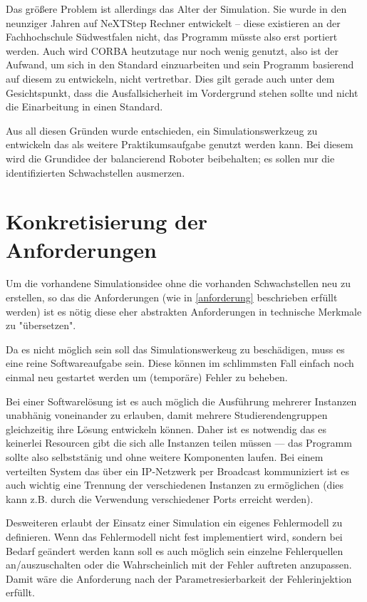 Das gr{\"{o}}{\ss}ere Problem ist allerdings das Alter der Simulation. Sie wurde in den neunziger Jahren auf 
NeXTStep Rechner entwickelt -- diese existieren an der Fachhochschule S{\"{u}}dwestfalen nicht, das Programm 
m{\"{u}}sste also erst portiert werden. Auch wird CORBA heutzutage nur noch wenig genutzt, also ist der Aufwand,
um sich in den Standard einzuarbeiten und sein Programm basierend auf diesem zu entwickeln, nicht vertretbar. 
Dies gilt gerade auch unter dem Gesichtspunkt, dass die Ausfallsicherheit im Vordergrund stehen sollte und
nicht die Einarbeitung in einen Standard.

Aus all diesen Gr{\"{u}}nden wurde entschieden, ein Simulationswerkzeug zu entwickeln das als weitere Praktikumsaufgabe
genutzt werden kann. Bei diesem wird die Grundidee der balancierend Roboter beibehalten; es sollen nur die identifizierten
Schwachstellen ausmerzen.

\clearpage
\section{Konkretisierung der Anforderungen}
Um die vorhandene Simulationsidee ohne die vorhanden Schwachstellen neu zu erstellen, so das die Anforderungen
(wie in \ref{anforderung} beschrieben erf{\"{u}}llt werden) ist es n{\"{o}}tig diese eher abstrakten Anforderungen in
technische Merkmale zu "{\"{u}}bersetzen".

Da es nicht m{\"{o}}glich sein soll das Simulationswerkeug zu besch{\"{a}}digen, muss es eine reine Softwareaufgabe
sein. Diese k{\"{o}}nnen im schlimmsten Fall einfach noch einmal neu gestartet werden um (tempor{\"{a}}re) Fehler zu
beheben.

Bei einer Softwarel{\"{o}}sung ist es auch m{\"{o}}glich die Ausf{\"{u}}hrung mehrerer Instanzen unabh{\"{a}}nig voneinander
zu erlauben, damit mehrere Studierendengruppen gleichzeitig ihre L{\"{o}}sung entwickeln k{\"{o}}nnen. Daher ist es notwendig
das es keinerlei Resourcen gibt die sich alle Instanzen teilen m{\"{u}}ssen --- das Programm sollte also selbstst{\"{a}}nig und
ohne weitere Komponenten laufen. Bei einem verteilten System das {\"{u}}ber ein IP-Netzwerk per Broadcast kommuniziert ist es
auch wichtig eine Trennung der verschiedenen Instanzen zu erm{\"{o}}glichen (dies kann z.B. durch die Verwendung verschiedener
Ports erreicht werden).

Desweiteren erlaubt der Einsatz einer Simulation ein eigenes Fehlermodell zu definieren. Wenn das Fehlermodell nicht fest
implementiert wird, sondern bei Bedarf ge{\"{a}}ndert werden kann soll es auch m{\"{o}}glich sein einzelne Fehlerquellen an/auszuschalten
oder die Wahrscheinlich mit der Fehler auftreten anzupassen. Damit w{\"{a}}re die Anforderung nach der Parametresierbarkeit
der Fehlerinjektion erf{\"{u}}llt.

